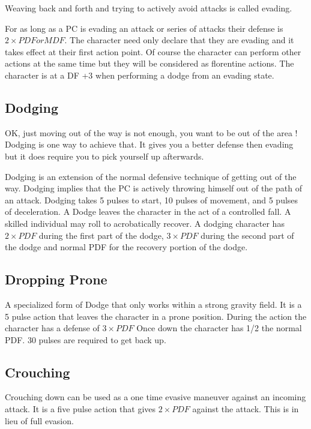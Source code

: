 Weaving back and forth and trying to actively avoid attacks is called evading.

For as long as a PC is evading an attack or series of attacks their defense is \( 2
\times PDF or MDF \). The character need only declare that they are evading and it takes effect at
their first action point. Of course the character can perform other actions
at the same time but they will be considered as florentine actions. The
character is at a DF +3 when performing a dodge from an evading state.

\subsection{{Dodging}}

OK, just moving out of the way is not enough,  you want to be out of the area ! Dodging is one way
to achieve that. It gives you a better defense then evading but it does require you to pick yourself up 
afterwards.

Dodging is an extension of the normal defensive technique of getting out
of the way. Dodging implies that the PC is actively throwing himself out
of the path of an attack. Dodging takes 5 pulses to start, 10 pulses of movement,
and 5 pulses of deceleration. A Dodge leaves the character in the act of
a controlled fall. A skilled individual may roll to acrobatically recover.
A dodging character has \( 2 \times PDF \) during the first part of the dodge,
\( 3 \times PDF \) during the second part of the dodge and normal PDF for
the recovery portion of the dodge.

\subsection{Dropping Prone}
A specialized form of Dodge that only works within a strong gravity
field. It is a 5 pulse action that leaves the character in a prone
position. During the action the character has a defense of \( 3 \times PDF \)
Once down the character has 1/2 the normal PDF. 30 pulses are required to
get back up.

\subsection{Crouching}

Crouching down can be used as a one time evasive maneuver against an
incoming attack. It is a five pulse action that gives \( 2 \times PDF \)
against the attack. This is in lieu of full evasion.

